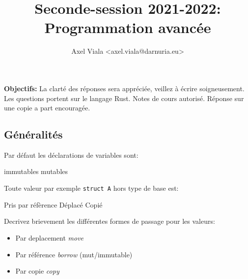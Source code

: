 \documentclass[11pt,a4paper,addpoint]{exam}
\author{\normalsize{Axel Viala <axel.viala@darnuria.eu>}}
\title{\normalsize{\textbf{Seconde-session 2021-2022: Programmation avancée}}}
\begin{document}
  \maketitle
  \begin{multicols}{2}

  \end{multicols}
  \textbf{Objectifs:} La clarté des réponses sera appréciée, veillez à écrire soigneusement. Les questions portent sur le langage Rust.
  Notes de cours autorisé. Réponse sur une copie a part encouragée.
  \newline
  \begin{questions}

    \section{Généralités}


    \question[1] Par défaut les déclarations de variables sont:
    \begin{checkboxes}
        \CorrectChoice immutables
        \choice mutables
    \end{checkboxes}

\question[1] Toute valeur par exemple \texttt{struct A} hors type de base est:
 \begin{checkboxes}
    \choice Pris par réfèrence
    \CorrectChoice Déplacé
    \choice Copié
\end{checkboxes}
\question[1] Decrivez brievement les différentes formes de passage pour les valeurs:
\begin{itemize}
    \item Par deplacement \textit{move}
    \item Par référence \textit{borrow} (mut/immutable)
    \item Par copie \textit{copy}
\end{itemize}
\vspace{1in}



\end{questions}
\end{document}
